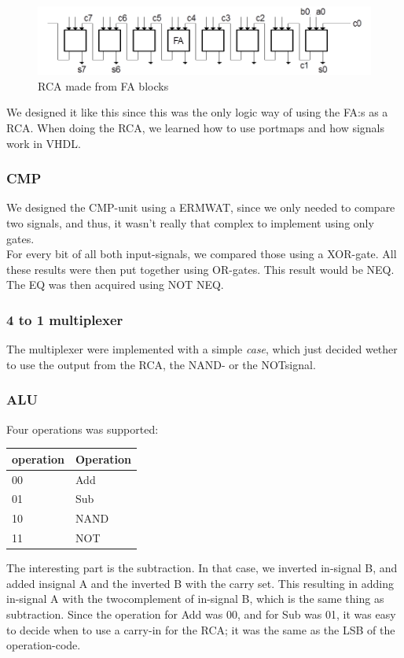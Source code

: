 \documentclass[a4paper]{article}
\begin{document}
\begin{figure}[H]
 \centering
 \includegraphics[scale=0.3]{RCA}
 \caption{RCA made from FA blocks}
\end{figure}

We designed it like this since this was the only logic way of using the FA:s as a RCA. 
When doing the RCA, we learned how to use portmaps and how signals work in VHDL.

\subsubsection{CMP}
We designed the CMP-unit using a ERMWAT, since we only needed to compare two signals, and thus, it wasn't really that complex to implement using only gates.\\
For every bit of all both input-signals, we compared those using a XOR-gate. All these results were then put together using OR-gates. This result would be NEQ. The EQ was then acquired using NOT NEQ.


\subsubsection{4 to 1 multiplexer}
The multiplexer were implemented with a simple \emph{case}, which just decided wether to use the output from the RCA, the NAND- or the NOTsignal.

\subsubsection{ALU}
Four operations was supported:\\
\begin{center}
\begin{tabular} {|l|l|} \hline
operation & Operation \\
\hline 00 & Add  \\
\hline 01 & Sub \\
\hline 10 & NAND \\
\hline 11 & NOT \\
\hline
\end{tabular}
\end{center}

The interesting part is the subtraction. In that case, we inverted in-signal B, and added insignal A and the inverted B with the carry set. This resulting in adding in-signal A with the twocomplement of in-signal B, which is the same thing as subtraction.
Since the operation for Add was 00, and for Sub was 01, it was easy to decide when to use a carry-in for the RCA; it was the same as the LSB of the operation-code.
\end{document}
